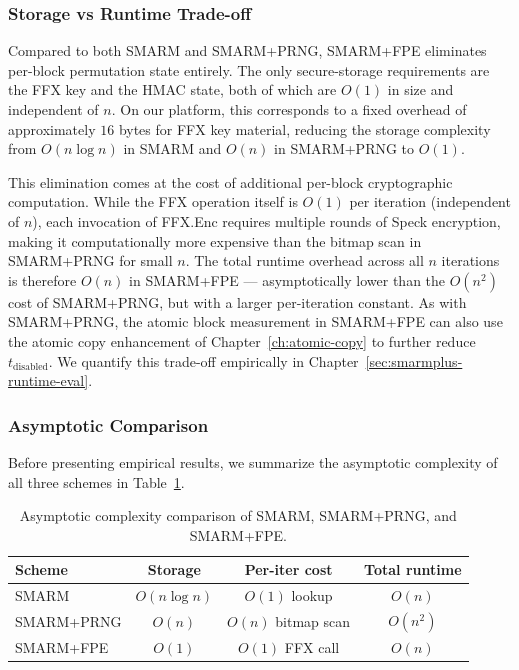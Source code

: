 \documentclass[a4paper,10pt]{article}
\begin{document}
{\subsubsection{Storage vs Runtime Trade-off}

Compared to both SMARM and SMARM+PRNG, SMARM+FPE eliminates 
per-block permutation state entirely. The only secure-storage 
requirements are the FFX key and the HMAC state, both of which 
are $O(1)$ in size and independent of $n$. On our platform, this 
corresponds to a fixed overhead of approximately $16$ bytes for 
FFX key material, reducing the storage complexity from 
$O(n \log n)$ in SMARM and $O(n)$ in SMARM+PRNG to $O(1)$.

This elimination comes at the cost of additional per-block 
cryptographic computation. While the FFX operation itself is 
$O(1)$ per iteration (independent of $n$), each invocation of 
\textsf{FFX.Enc} requires multiple rounds of Speck encryption, 
making it computationally more expensive than the bitmap scan in 
SMARM+PRNG for small $n$. The total runtime overhead across all 
$n$ iterations is therefore $O(n)$ in SMARM+FPE — asymptotically 
lower than the $O(n^2)$ cost of SMARM+PRNG, but with a larger 
per-iteration constant. As with SMARM+PRNG, the atomic block 
measurement in SMARM+FPE can also use the atomic copy enhancement 
of Chapter~\ref{ch:atomic-copy} to further reduce 
$t_{\mathrm{disabled}}$. We quantify this trade-off empirically in 
Chapter~\ref{sec:smarmplus-runtime-eval}.

\subsubsection{Asymptotic Comparison}

Before presenting empirical results, we summarize the 
asymptotic complexity of all three schemes in 
Table~\ref{tab:asymptotic_comparison}.

\begin{table}[H]
\centering
\caption{Asymptotic complexity comparison of SMARM, 
SMARM+PRNG, and SMARM+FPE.}
\label{tab:asymptotic_comparison}
\begin{tabular}{lccc}
\toprule
\textbf{Scheme} & \textbf{Storage} & \textbf{Per-iter cost} 
& \textbf{Total runtime} \\
\midrule
SMARM         & $O(n \log n)$ & $O(1)$ lookup       & $O(n)$  \\
SMARM+PRNG    & $O(n)$        & $O(n)$ bitmap scan  & $O(n^2)$ \\
SMARM+FPE     & $O(1)$        & $O(1)$ FFX call     & $O(n)$  \\
\bottomrule
\end{tabular}
\end{table}

}
\end{document}

